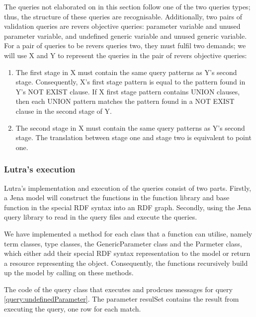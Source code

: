 \para 
The queries not elaborated on in this section follow one of the two queries types; thus, the structure of these queries are recognisable. Additionally, two pairs of validation queries are revers objective queries: parameter variable and unused parameter variable, and undefined generic variable and unused generic variable. For a pair of queries to be revers queries two, they must fulfil two demands; we will use X and Y to represent the queries in the pair of revers objective queries: 
\begin{enumerate}
  \item The first stage in X must contain the same query patterns as Y's second stage. Consequently, X's first stage pattern is equal to the pattern found in Y's NOT EXIST clause. If X first stage pattern contains UNION clauses, then each UNION pattern matches the pattern found in a NOT EXIST clause in the second stage of Y.
  \item The second stage in X must contain the same query patterns as Y's second stage. The translation between stage one and stage two is equivalent to point one. 
\end{enumerate}

\subsubsection{Lutra's execution}
Lutra's implementation and execution of the queries consist of two parts. Firstly, a Jena model will construct the functions in the function library and base function in the special RDF syntax into an RDF graph. Secondly, using the Jena query library to read in the query files and execute the queries.  

\para
We have implemented a method for each class that a function can utilise, namely term classes, type classes, the GenericParameter class and the Parmeter class, which either add their special RDF syntax representation to the model or return a resource representing the object. Consequently, the functions recursively build up the model by calling on these methods. 

\begin{code}
  \label{queryClassExample}
    The code of the query class that executes and prodcues messages for query \ref{query:undefinedParameter}. The parameter resulSet contains the result from executing the query, one row for each match.
\end{code}


